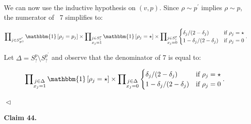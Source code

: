 We can now use the inductive hypothesis on $(v,p)$. Since $\rho\sim p^{\prime}$ implies $\rho\sim p$, the numerator of  7 simplifies to:\par


\[\begin{gathered}
\prod\nolimits_{j\in S^{p^{\prime}}_{\neq\mathord{?}}}\mathbbm{1}\left[\rho_{j}=p_{j}\right]\times\prod\nolimits_{\begin{subarray}{c}j\in S^{p}_{\mathord{?}}\\
x_{j}=1\end{subarray}}\mathbbm{1}\left[\rho_{j}=\star\right]\times\prod\nolimits_{\begin{subarray}{c}j\in S^{p}_{\mathord{?}}\\
x_{j}=0\end{subarray}}\begin{cases}\delta_{j}/(2-\delta_{j})&\textup{if $\rho_{j}=\star$}\\
1-\delta_{j}/(2-\delta_{j})&\textup{if $\rho_{j}=0$}\end{cases}.
\end{gathered}\]


Let $\Delta=S^{p}_{\mathord{?}}\setminus S^{p^{\prime}}_{\mathord{?}}$ and observe that the denominator of  7 is equal to:\par


\[\begin{gathered}
\prod\nolimits_{\begin{subarray}{c}j\in\Delta\\
x_{j}=1\end{subarray}}\mathbbm{1}\left[\rho_{j}=\star\right]\times\prod\nolimits_{\begin{subarray}{c}j\in\Delta\\
x_{j}=0\end{subarray}}\begin{cases}\delta_{j}/(2-\delta_{j})&\textup{if $\rho_{j}=\star$}\\
1-\delta_{j}/(2-\delta_{j})&\textup{if $\rho_{j}=0$}\end{cases}.\
\end{gathered}\]


$\vartriangleleft$\par





\par\medskip\noindent\textbf{
Claim 44. 
}\par



